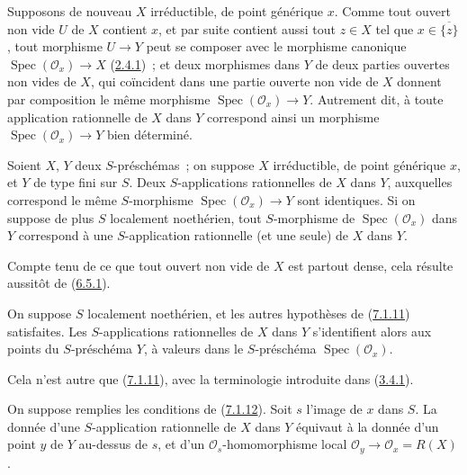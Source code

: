 \begin{env}[7.1.10]
\label{I.7.1.10-fr}
Supposons de nouveau $X$ irréductible, de point générique $x$. Comme tout
ouvert non vide $U$ de $X$ contient $x$, et par suite contient aussi tout
$z\in X$ tel que $x\in\overline{\{z\}}$, tout morphisme $U\to Y$ peut se
composer avec le morphisme canonique $\operatorname{Spec}(\mathscr{O}_x)\to X$
(\hyperref[I.2.4.1-fr]{2.4.1})~; et deux morphismes dans $Y$ de deux parties
ouvertes non vides de $X$, qui coïncident dans une partie ouverte non vide de
$X$ donnent par composition le même morphisme
$\operatorname{Spec}(\mathscr{O}_x)\to Y$. Autrement dit, à toute application
rationnelle de $X$ dans $Y$ correspond ainsi un morphisme
$\operatorname{Spec}(\mathscr{O}_x)\to Y$ bien déterminé.
\end{env}

\begin{proposition}[7.1.11]
\label{I.7.1.11-fr}
Soient $X$, $Y$ deux $S$-préschémas~; on suppose $X$ irréductible, de point
générique $x$, et $Y$ de type fini sur $S$. Deux $S$-applications rationnelles
de $X$ dans $Y$, auxquelles correspond le même $S$-morphisme
$\operatorname{Spec}(\mathscr{O}_x)\to Y$ sont identiques. Si on suppose de
plus $S$ localement noethérien, tout $S$-morphisme de
$\operatorname{Spec}(\mathscr{O}_x)$ dans $Y$ correspond à une $S$-application
rationnelle (et une seule) de $X$ dans $Y$.
\end{proposition}

Compte tenu de ce que tout ouvert non vide de $X$ est partout dense, cela
résulte aussitôt de (\hyperref[I.6.5.1-fr]{6.5.1}).

\begin{corollary}[7.1.12]
\label{I.7.1.12-fr}
On suppose $S$ localement noethérien, et les autres hypothèses de
\textup{(\hyperref[I.7.1.11-fr]{7.1.11})} satisfaites. Les $S$-applications rationnelles
de $X$ dans $Y$ s'identifient alors aux points du $S$-préschéma $Y$, à valeurs
dans le $S$-préschéma $\operatorname{Spec}(\mathscr{O}_x)$.
\end{corollary}

Cela n'est autre que (\hyperref[I.7.1.11-fr]{7.1.11}), avec la terminologie
introduite dans (\hyperref[I.3.4.1-fr]{3.4.1}).

\begin{corollary}[7.1.13]
\label{I.7.1.13-fr}
On suppose remplies les conditions de \textup{(\hyperref[I.7.1.12-fr]{7.1.12})}. Soit
$s$ l'image de $x$ dans $S$. La donnée d'une $S$-application rationnelle de
$X$ dans $Y$ équivaut à la donnée d'un point $y$ de $Y$ au-dessus de $s$, et
d'un $\mathscr{O}_s$-homomorphisme local
$\mathscr{O}_y\to\mathscr{O}_x=R(X)$.
\end{corollary}


